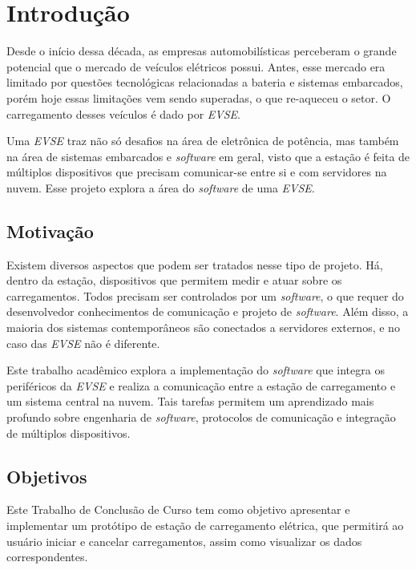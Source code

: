 \chapter{Introdução}
\label{stateofart:intro}

  Desde o início dessa década, as empresas automobilísticas perceberam o grande potencial que o mercado de veículos elétricos possui. Antes, esse mercado era limitado por questões tecnológicas relacionadas a bateria e sistemas embarcados, porém hoje essas limitações vem sendo superadas, o que re-aqueceu o setor. O carregamento desses veículos é dado por \textit{\ac{EVSE}}.

  Uma \textit{\ac{EVSE}} traz não só desafios na área de eletrônica de potência, mas também na área de sistemas embarcados e \textit{software} em geral, visto que a estação é feita de múltiplos dispositivos que precisam comunicar-se entre si e com servidores na nuvem. Esse projeto explora a área do \textit{software} de uma \textit{\ac{EVSE}}.

  \section{Motivação}
  \label{stateofart:intro:motivation}

    Existem diversos aspectos que podem ser tratados nesse tipo de projeto. Há, dentro da estação, dispositivos que permitem medir e atuar sobre os carregamentos. Todos precisam ser controlados por um \textit{software}, o que requer do desenvolvedor conhecimentos de comunicação e projeto de \textit{software}. Além disso, a maioria dos sistemas contemporâneos são conectados a servidores externos, e no caso das \textit{\ac{EVSE}} não é diferente.

    Este trabalho acadêmico explora a implementação do \textit{software} que integra os periféricos da \textit{\ac{EVSE}} e realiza a comunicação entre a estação de carregamento e um sistema central na nuvem. Tais tarefas permitem um aprendizado mais profundo sobre engenharia de \textit{software}, protocolos de comunicação e integração de múltiplos dispositivos.

  \section{Objetivos}
  \label{stateofart:intro:objectives}

    Este Trabalho de Conclusão de Curso tem como objetivo apresentar e implementar um protótipo de estação de carregamento elétrica, que permitirá ao usuário iniciar e cancelar carregamentos, assim como visualizar os dados correspondentes.

